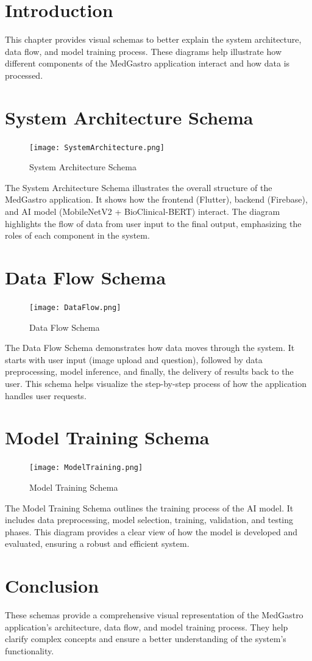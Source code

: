 \documentclass[12pt,a4paper]{report}
\begin{document}
\section{Introduction}
This chapter provides visual schemas to better explain the system architecture, data flow, and model training process. These diagrams help illustrate how different components of the MedGastro application interact and how data is processed.

\section{System Architecture Schema}
\begin{figure}[H]
    \centering
    \texttt{[image: SystemArchitecture.png]}
    \caption{System Architecture Schema}
    \label{fig:system-architecture}
\end{figure}
The System Architecture Schema illustrates the overall structure of the MedGastro application. It shows how the frontend (Flutter), backend (Firebase), and AI model (MobileNetV2 + BioClinical-BERT) interact. The diagram highlights the flow of data from user input to the final output, emphasizing the roles of each component in the system.

\section{Data Flow Schema}
\begin{figure}[H]
    \centering
    \texttt{[image: DataFlow.png]}
    \caption{Data Flow Schema}
    \label{fig:data-flow}
\end{figure}
The Data Flow Schema demonstrates how data moves through the system. It starts with user input (image upload and question), followed by data preprocessing, model inference, and finally, the delivery of results back to the user. This schema helps visualize the step-by-step process of how the application handles user requests.

\section{Model Training Schema}
\begin{figure}[H]
    \centering
    \texttt{[image: ModelTraining.png]}
    \caption{Model Training Schema}
    \label{fig:model-training}
\end{figure}
The Model Training Schema outlines the training process of the AI model. It includes data preprocessing, model selection, training, validation, and testing phases. This diagram provides a clear view of how the model is developed and evaluated, ensuring a robust and efficient system.

\section{Conclusion}
These schemas provide a comprehensive visual representation of the MedGastro application's architecture, data flow, and model training process. They help clarify complex concepts and ensure a better understanding of the system's functionality.
\end{document}
